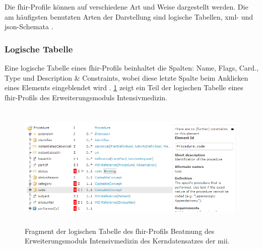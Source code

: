 Die \ac{fhir}-Profile können auf verschiedene Art und Weise dargestellt werden. Die am häufigsten benutzten Arten der Darstellung sind logische Tabellen, \ac{xml}- und \ac{json}-Schemata \cite{fhirformat}.

\subsubsection{Logische Tabelle} \label{subsubsec:logtab}

Eine logische Tabelle eines \ac{fhir}-Profils beinhaltet die Spalten: Name, Flags, Card., Type und Description \& Constraints, wobei diese letzte Spalte beim Anklicken eines Elements eingeblendet wird \cite{fhirformat}. \ref{fig:logic-table} zeigt ein Teil der logischen Tabelle eines \ac{fhir}-Profils des Erweiterungsmoduls \glqq Intensivmedizin\grqq{}.

\begin{figure}[ht]
	\centering
	\includegraphics[height=6cm]{figures/beatmung}
	\caption[Logische Tabelle eines \acs{fhir}-Profils]{Fragment der logischen Tabelle des \acs{fhir}-Profils Beatmung des Erweiterungsmoduls \glqq Intensivmedizin\grqq{} des Kerndatensatzes der \acs{mii}.}
	\label{fig:logic-table}
\end{figure}

